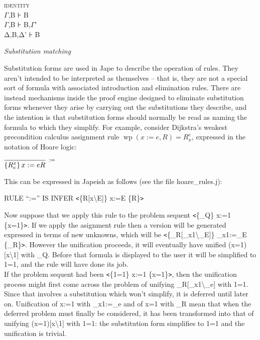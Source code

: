 \documentclass[11pt]{book}
\newcommand{\tab}{\hspace{5mm}}
\newcommand{\reason}[1]{\scalebox{0.85}{#1}}
\begin{document}
\textsc{identity\tab }\\
\textsc{\ensuremath{\Gamma}}\textsc{,B} \textsc{⊦} \textsc{B}\\
\textsc{\ensuremath{\Gamma}}\textsc{,B} \textsc{⊦} \textsc{B,}\textsc{\ensuremath{\Gamma}}\textsc{'}\\
\textsc{Δ}\textsc{,B,}\textsc{Δ}\textsc{'} \textsc{⊦} \textsc{B}


\textit{Substitution matching}


Substitution forms are used in Jape to describe the operation of rules. They aren't intended to be interpreted as themselves -- that is, they are not a special sort of formula with associated introduction and elimination rules. There are instead mechanisms inside the proof engine designed to eliminate substitution forms whenever they arise by carrying out the substitutions they describe, and the intention is that substitution forms should normally be read as naming the formula to which they simplify. For example, consider Dijkstra's weakest precondition calculus assignment rule $\operatorname{wp}(x:=e,R)=R_{x}^{e} $, expressed in the notation of Hoare logic:


$\infer[\reason{$:=$}]
       {\left\{ R^{x}_{e} \right\} x:=e{R}}
       {}$

This can be expressed in Japeish as follows (see the file hoare\_rules.j):

{\small RULE ``:='' IS INFER \texttt{<}\{R[x{\textbackslash}E]\} x:=E \{R\}\texttt{>}}


Now suppose that we apply this rule to the problem sequent {\small \texttt{<}\{\_Q\} x:=1 \{x=1\}\texttt{>}}. If we apply the asignment rule then a version will be generated expressed in terms of new unknowns, which will be {\small \texttt{<}\{\_R[\_x1{\textbackslash}\_E]\} \_x1:=\_E \{\_R\}\texttt{>}}. However the unification proceeds, it will eventually have unified {\small (x=1)[x{\textbackslash}1]} with {\small \_Q}. Before that formula is displayed to the user it will be simplified to {\small 1=1}, and the rule will have done its job.\\
If the problem sequent had been {\small \texttt{<}\{1=1\} x:=1 \{x=1\}\texttt{>}}, then the unification process might first come across the problem of unifying {\small \_R[\_x1{\textbackslash}\_e]} with {\small 1=1}. Since that involves a substitution which won't simplify, it is deferred until later on. Unification of {\small x:=1} with {\small \_x1:=\_e} and of {\small x=1} with {\small \_R} mean that when the deferred problem must finally be considered, it has been transformed into that of unifying {\small (x=1)[x{\textbackslash}1]} with {\small 1=1}: the substitution form simplifies to {\small 1=1} and the unification is trivial.
\end{document}
